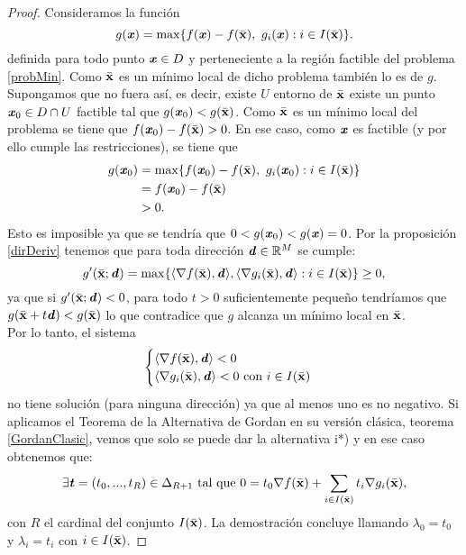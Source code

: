 		\begin{proof}
			Consideramos la función
			\[
			g(\textbf{\emph{x}}) = \max \{ f(\textbf{\emph{x}}) - f(\bar{\mathbf{x}}),\text{ } g_i(\textbf{\emph{x}}) : i \in I(\bar{\mathbf{x}})\}.
			\]
			definida para todo punto $ \textbf{\emph{x}} \in D$ y perteneciente a la región factible del problema \eqref{probMin}. Como $ \bar{\mathbf{x}} $ es un mínimo local de dicho problema también lo es de $ g $. Supongamos que no fuera así, es decir, existe $ U $ entorno de $ \bar{\mathbf{x}} $ existe un punto $ \textbf{\emph{x}}_0 \in D \cap U $  factible tal que $ g(\textbf{\emph{x}}_0) < g(\bar{\mathbf{x}}) $. Como $ \bar{\mathbf{x}} $ es un mínimo local del problema se tiene que $ f(\textbf{\emph{x}}_0)-f(\bar{\mathbf{x}}) > 0 $. En ese caso, como $ \textbf{\emph{x}} $ es factible (y por ello cumple las restricciones), se tiene que 
			\begin{equation*}
			\begin{split}
			g(\textbf{\emph{x}}_0) & = \max \{ f(\textbf{\emph{x}}_0) - f(\bar{\mathbf{x}}),\text{ } g_i(\textbf{\emph{x}}_0) : i \in I(\bar{\mathbf{x}})\} \\ 
			&=  f(\textbf{\emph{x}}_0) - f(\bar{\mathbf{x}})\\ &
			> 0. 
			\end{split}
			\end{equation*}
			Esto es imposible ya que se tendría que $ 0 < g(\textbf{\emph{x}}_0) < g(\textbf{\emph{x}}) = 0 $. Por la proposición \ref{dirDeriv} tenemos que para toda dirección $ \textbf{\emph{d}} \in \mathbb{R}^M $ se cumple:
			\[
			g'(\bar{\mathbf{x}};\textbf{\emph{d}}) = \max \{ \langle \nabla f(\bar{\mathbf{x}}), \textbf{\emph{d}}\rangle , \langle \nabla g_i(\bar{\mathbf{x}}),\textbf{\emph{d}} \rangle : i \in I(\bar{\mathbf{x}})\} \geq 0,
			\]
			ya que si $ g'(\bar{\mathbf{x}};\textbf{\emph{d}}) < 0 $, para todo $ t > 0 $ suficientemente pequeño tendríamos que $ g(\bar{\mathbf{x}} + t\textbf{\emph{d}}) < g(\bar{\mathbf{x}}) $ lo que contradice que $ g $ alcanza un mínimo local en $ \bar{\mathbf{x}} $. \\
			
			Por lo tanto, el sistema 
			\begin{equation*}
			\begin{cases}
			\langle \nabla f(\bar{\mathbf{x}}), \textbf{\emph{d}}\rangle  < 0 \\
			\langle \nabla g_i(\bar{\mathbf{x}}),\textbf{\emph{d}} \rangle < 0\text{ con } i \in I(\bar{\mathbf{x}})
			\end{cases}
			\end{equation*}
			no tiene solución (para ninguna dirección) ya que al menos uno es no negativo. Si aplicamos el Teorema de la Alternativa de Gordan en su versión clásica, teorema \ref{GordanClasic}, vemos que solo se puede dar la alternativa i*) y en ese caso obtenemos que:
			\[
			 \exists \textbf{\emph{t}} = (t_0, ..., t_{R})\in \Delta_{R+1}  \text{ tal que }0 = t_0 \nabla f(\bar{\mathbf{x}}) + \sum_{i \in I(\bar{\mathbf{x}})}  t_i \nabla g_i (\bar{\mathbf{x}}),
			 \]
			con $ R $ el cardinal del conjunto $ I(\bar{\mathbf{x}}) $. La demostración concluye llamando $ \lambda_0 = t_0 $ y $ \lambda_i = t_i $ con $ i \in I(\bar{\mathbf{x}}) $.
		\end{proof}
	\bigskip
